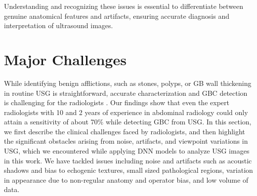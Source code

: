%

Understanding and recognizing these issues is essential to differentiate between genuine anatomical features and artifacts, ensuring accurate diagnosis and interpretation of ultrasound images. 

\section{Major Challenges}
\label{sec:challenges}
%
While identifying benign afflictions, such as stones, polyps, or GB wall thickening in routine USG is straightforward, accurate characterization and GBC detection is challenging for the radiologists \cite{gb-rads-paper, gupta2020imaging}. Our findings show that even the expert radiologists with 10 and 2 years of experience in abdominal radiology could only attain a sensitivity of about 70\% while detecting GBC from USG. In this section, we first describe the clinical challenges faced by radiologists, and then highlight the significant obstacles arising from noise, artifacts, and viewpoint variations in USG, which we encountered while applying DNN models to analyze USG images in this work. We have tackled issues including noise and artifacts such as acoustic shadows and bias to echogenic textures, small sized pathological regions, variation in appearance due to non-regular anatomy and operator bias, and low volume of data.  %

